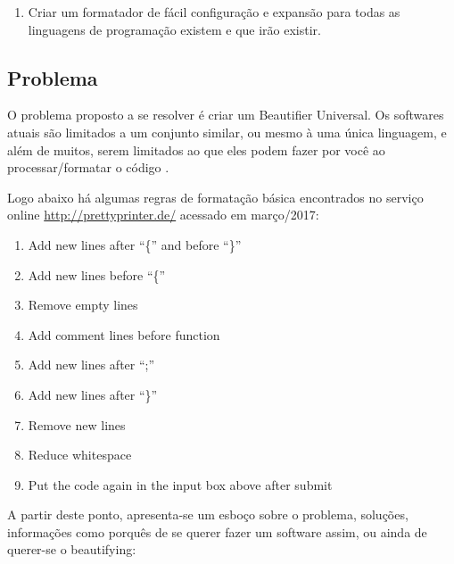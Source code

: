     \medskip
    \begin{myquote}
    \begin{enumerate}[nolistsep]
        \item Criar um formatador de fácil configuração e expansão para todas as linguagens de
              programação existem e que irão existir.
    \end{enumerate}
    \end{myquote}



\subsection{Problema}

    O problema proposto a se resolver é criar um Beautifier Universal. Os softwares atuais são
    limitados a um conjunto similar, ou mesmo à uma única linguagem, e além de muitos, serem
    limitados ao que eles podem fazer por você ao processar/formatar o código \cite{Terence}.

    Logo abaixo há algumas regras de formatação básica encontrados no serviço online
    \url{http://prettyprinter.de/} acessado em março/2017:

    \medskip
    \begin{myquote}
    \begin{enumerate}[nolistsep]
        \item Add new lines after ``\{'' and before ``\}''
        \item Add new lines before ``\{''
        \item Remove empty lines
        \item Add comment lines before function
        \item Add new lines after ``;''
        \item Add new lines after ``\}''
        \item Remove new lines
        \item Reduce whitespace
        \item Put the code again in the input box above after submit
    \end{enumerate}
    \end{myquote}

    A partir deste ponto, apresenta-se um esboço sobre o problema, soluções, informações como
    porquês de se querer fazer um software assim, ou ainda de querer-se o beautifying:

